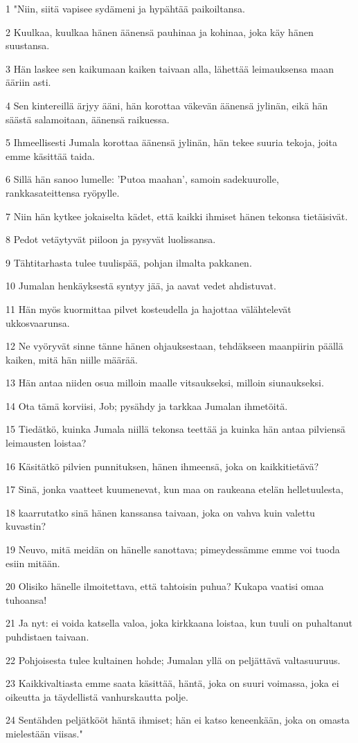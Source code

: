 \par 1 "Niin, siitä vapisee sydämeni ja hypähtää paikoiltansa.
\par 2 Kuulkaa, kuulkaa hänen äänensä pauhinaa ja kohinaa, joka käy hänen suustansa.
\par 3 Hän laskee sen kaikumaan kaiken taivaan alla, lähettää leimauksensa maan ääriin asti.
\par 4 Sen kintereillä ärjyy ääni, hän korottaa väkevän äänensä jylinän, eikä hän säästä salamoitaan, äänensä raikuessa.
\par 5 Ihmeellisesti Jumala korottaa äänensä jylinän, hän tekee suuria tekoja, joita emme käsittää taida.
\par 6 Sillä hän sanoo lumelle: 'Putoa maahan', samoin sadekuurolle, rankkasateittensa ryöpylle.
\par 7 Niin hän kytkee jokaiselta kädet, että kaikki ihmiset hänen tekonsa tietäisivät.
\par 8 Pedot vetäytyvät piiloon ja pysyvät luolissansa.
\par 9 Tähtitarhasta tulee tuulispää, pohjan ilmalta pakkanen.
\par 10 Jumalan henkäyksestä syntyy jää, ja aavat vedet ahdistuvat.
\par 11 Hän myös kuormittaa pilvet kosteudella ja hajottaa välähtelevät ukkosvaarunsa.
\par 12 Ne vyöryvät sinne tänne hänen ohjauksestaan, tehdäkseen maanpiirin päällä kaiken, mitä hän niille määrää.
\par 13 Hän antaa niiden osua milloin maalle vitsaukseksi, milloin siunaukseksi.
\par 14 Ota tämä korviisi, Job; pysähdy ja tarkkaa Jumalan ihmetöitä.
\par 15 Tiedätkö, kuinka Jumala niillä tekonsa teettää ja kuinka hän antaa pilviensä leimausten loistaa?
\par 16 Käsitätkö pilvien punnituksen, hänen ihmeensä, joka on kaikkitietävä?
\par 17 Sinä, jonka vaatteet kuumenevat, kun maa on raukeana etelän helletuulesta,
\par 18 kaarrutatko sinä hänen kanssansa taivaan, joka on vahva kuin valettu kuvastin?
\par 19 Neuvo, mitä meidän on hänelle sanottava; pimeydessämme emme voi tuoda esiin mitään.
\par 20 Olisiko hänelle ilmoitettava, että tahtoisin puhua? Kukapa vaatisi omaa tuhoansa!
\par 21 Ja nyt: ei voida katsella valoa, joka kirkkaana loistaa, kun tuuli on puhaltanut puhdistaen taivaan.
\par 22 Pohjoisesta tulee kultainen hohde; Jumalan yllä on peljättävä valtasuuruus.
\par 23 Kaikkivaltiasta emme saata käsittää, häntä, joka on suuri voimassa, joka ei oikeutta ja täydellistä vanhurskautta polje.
\par 24 Sentähden peljätkööt häntä ihmiset; hän ei katso keneenkään, joka on omasta mielestään viisas."

